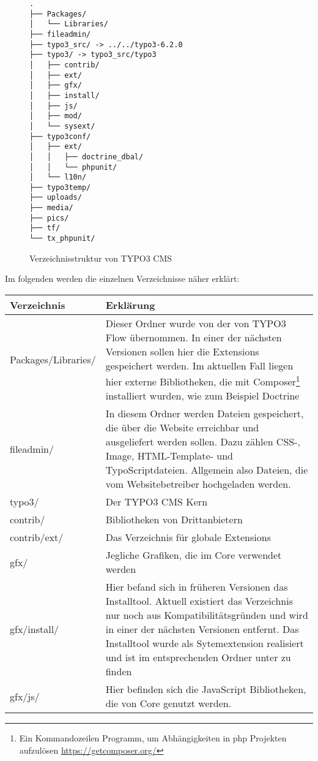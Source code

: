 \begin{figure}
\begin{Verbatim}[samepage=true]
.
├── Packages/
│   └── Libraries/
├── fileadmin/
├── typo3_src/ -> ../../typo3-6.2.0
├── typo3/ -> typo3_src/typo3
│   ├── contrib/
│   ├── ext/
│   ├── gfx/
│   ├── install/
│   ├── js/
│   ├── mod/
│   └── sysext/
├── typo3conf/
│   ├── ext/
│   │   ├── doctrine_dbal/
│   │   └── phpunit/
│   └── l10n/
├── typo3temp/
├── uploads/
├── media/
├── pics/
├── tf/
└── tx_phpunit/
\end{Verbatim}
\caption{Verzeichnisstruktur von TYPO3 CMS}
\label{pic:typo3FolderStructure}
\end{figure}
Im folgenden werden die einzelnen Verzeichnisse näher erklärt:

\begin{table}
	\begin{tabularx}{\textwidth}{|X|X|}
		\hline
		Verzeichnis & Erklärung\\ \hline
		Packages/Libraries/ & Dieser Ordner wurde von der von TYPO3 Flow übernommen. In einer der nächsten Versionen sollen hier die Extensions gespeichert werden. Im aktuellen Fall liegen hier externe Bibliotheken, die mit Composer\footnote{Ein Kommandozeilen Programm, um Abhängigkeiten in \gls{php} Projekten aufzulösen \url{https://getcomposer.org/}} installiert wurden, wie zum Beispiel Doctrine\\ \hline
		fileadmin/ & In diesem Ordner werden Dateien gespeichert, die über die Website erreichbar und ausgeliefert werden sollen. Dazu zählen CSS-, Image, HTML-Template- und TypoScriptdateien. Allgemein also Dateien, die vom Websitebetreiber hochgeladen werden.\\ \hline
		typo3/ & Der TYPO3 CMS Kern\\ \hline
		contrib/ & Bibliotheken von Drittanbietern\\ \hline
		contrib/ext/ & Das Verzeichnis für globale Extensions \\ \hline
		gfx/ & Jegliche Grafiken, die im Core verwendet werden \\ \hline
		gfx/install/ & Hier befand sich in früheren Versionen das Installtool. Aktuell existiert das Verzeichnis nur noch aus Kompatibilitätsgründen und wird in einer der nächsten Versionen entfernt. Das Installtool wurde als Sytemextension realisiert und ist im entsprechenden Ordner unter \pdf{sysext/install/} zu finden\\ \hline
		gfx/js/ & Hier befinden sich die JavaScript Bibliotheken, die von Core genutzt werden.\\ \hline

\end{tabularx}
\end{table}

